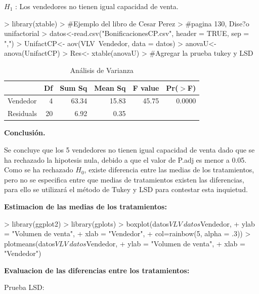 \documentclass[12pt,letterpaper]{report}
\begin{document}
\textbf{$H_{1}$} : Los vendedores no tienen igual capacidad de venta. 

\begin{Schunk}
\begin{Sinput}
> library(xtable)
> #Ejemplo del libro de Cesar Perez
> #pagina 130, Dise?o unifactorial
> datos<-read.csv("BonificacionesCP.csv", header = TRUE, sep = ",")
> UnifactCP<- aov(VLV~Vendedor, data = datos)
> anovaU<-anova(UnifactCP)
> Res<- xtable(anovaU)
> #Agregar la prueba tukey y LSD
\end{Sinput}
\end{Schunk}

\begin{table}[ht]
\centering
\begin{tabular}{lrrrrr}
  \hline
 & Df & Sum Sq & Mean Sq & F value & Pr($>$F) \\ 
  \hline
Vendedor & 4 & 63.34 & 15.83 & 45.75 & 0.0000 \\ 
  Residuals & 20 & 6.92 & 0.35 &  &  \\ 
   \hline
\end{tabular}
\caption{Análisis de Varianza}
\end{table}

\textbf{Conclusión.}

Se concluye que los 5 vendedores no tienen igual capacidad de venta dado que se ha rechazado la hipotesis nula, debido a que el valor de P.adj es menor a 0.05.
Como se ha rechazado $H_0$, existe diferencia entre las medias de los tratamientos, pero no
se especifica entre que medias de tratamientos existen las diferencias, para ello se utilizará el método de Tukey y LSD para contestar esta inquietud.

\textbf{Estimacion de las medias de los tratamientos:}
\begin{Schunk}
\begin{Sinput}
> library(ggplot2)
> library(gplots)
> boxplot(datos$VLV~datos$Vendedor,
+         ylab = "Volumen de venta",
+         xlab = "Vendedor",
+         col=rainbow(5, alpha = .3))
> plotmeans(datos$VLV~datos$Vendedor,
+           ylab = "Volumen de venta",
+           xlab = "Vendedor")
\end{Sinput}
\end{Schunk}

\textbf{Evaluacion de las diferencias entre los tratamientos:}

Prueba LSD:
\begin{Schunk}
\end{Schunk}
\end{document}
